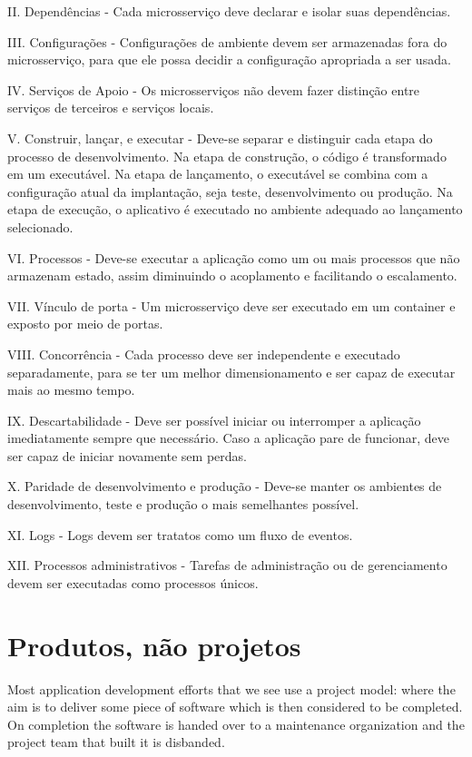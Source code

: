 II. Dependências - Cada microsserviço deve declarar e isolar suas dependências.

III. Configurações - Configurações de ambiente devem ser armazenadas fora do microsserviço, para que ele possa decidir a configuração apropriada a ser usada.

IV. Serviços de Apoio - Os microsserviços não devem fazer distinção entre serviços de terceiros e serviços locais.

V. Construir, lançar, e executar - Deve-se separar e distinguir cada etapa do processo de desenvolvimento. Na etapa de construção, o código é transformado em um executável. Na etapa de lançamento, o executável se combina com a configuração atual da implantação, seja teste, desenvolvimento ou produção. Na etapa de execução, o aplicativo é executado no ambiente adequado ao lançamento selecionado.

VI. Processos - Deve-se executar a aplicação como um ou mais processos que não armazenam estado, assim diminuindo o acoplamento e facilitando o escalamento.

VII. Vínculo de porta - Um microsserviço deve ser executado em um container e exposto por meio de portas.

VIII. Concorrência - Cada processo deve ser independente e executado separadamente, para se ter um melhor dimensionamento e ser capaz de executar mais ao mesmo tempo.

IX. Descartabilidade - Deve ser possível iniciar ou interromper a aplicação imediatamente sempre que necessário. Caso a aplicação pare de funcionar, deve ser capaz de iniciar novamente sem perdas.

X. Paridade de desenvolvimento e produção - Deve-se manter os ambientes de desenvolvimento, teste e produção o mais semelhantes possível.

XI. Logs - Logs devem ser tratatos como um fluxo de eventos.

XII. Processos administrativos - Tarefas de administração ou de gerenciamento devem ser executadas como processos únicos. \cite{12factor, oracle_microservices,12fatores-rita}

\section{Produtos, não projetos}

Most application development efforts that we see use a project model: where the aim is to deliver some piece of software which is then considered to be completed. On completion the software is handed over to a maintenance organization and the project team that built it is disbanded.

